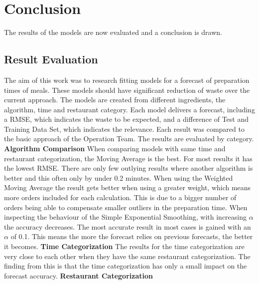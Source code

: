 \chapter{Conclusion}\label{chapter:Conclusion}
The results of the models are now evaluated and a conclusion is drawn.
\section{Result Evaluation}
The aim of this work was to research fitting models for a forecast of preparation times of meals. These models should have significant reduction of waste over the current approach.\newline
The models are created from different ingredients, the algorithm, time and restaurant category. Each model delivers a forecast, including a RMSE, which indicates the waste to be expected, and a difference of Test and Training Data Set, which indicates the relevance. Each result was compared to the basic approach of the Operation Team.\newline
The results are evaluated by category.\newline
\newline\textbf{Algorithm Comparison}\newline
When comparing models with same time and restaurant categorization, the Moving Average is the best. For most results it has the lowest RMSE. There are only few outlying results where another algorithm is better and this often only by under 0.2 minutes.\newline
When using the Weighted Moving Average the result gets better when using a greater weight, which means more orders included for each calculation. This is due to a bigger number of orders being able to compensate smaller outliers in the preparation time.\newline
When inspecting the behaviour of the Simple Exponential Smoothing, with increasing $\alpha$ the accuracy decreases. The most accurate result in most cases is gained with an $\alpha$ of 0.1. This means the more the forecast relies on previous forecasts, the better it becomes.
\newline\newline\textbf{Time Categorization}\newline
The results for the time categorization are very close to each other when they have the same restaurant categorization. The finding from this is that the time categorization has only a small impact on the forecast accuracy.
\newline\newline\newline\newline\textbf{Restaurant Categorization}\newline
